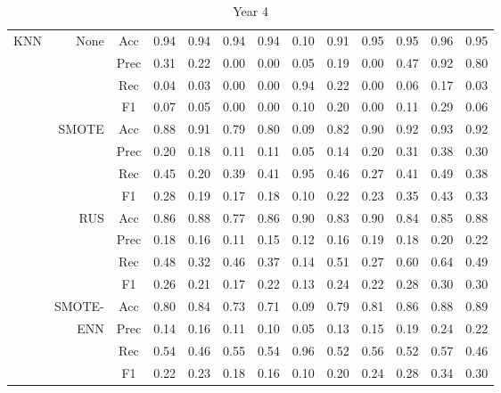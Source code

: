 \begin{table*}
\begin{narrow}{-1cm}{-1cm}
\begin{subtable}[t]{2.05\columnwidth}
\begin{tabular}{l|r|c|cccccccccc}
        KNN & None & Acc & 0.94 & 0.94 & 0.94 & 0.94 & 0.10 & 0.91 & 0.95 & 0.95 & 0.96 & 0.95 \\
        ~ & ~ & Prec & 0.31 & 0.22 & 0.00 & 0.00 & 0.05 & 0.19 & 0.00 & 0.47 & 0.92 & 0.80 \\
        ~ & ~ & Rec & 0.04 & 0.03 & 0.00 & 0.00 & 0.94 & 0.22 & 0.00 & 0.06 & 0.17 & 0.03 \\
        ~ & ~ & F1 & 0.07 & 0.05 & 0.00 & 0.00 & 0.10 & 0.20 & 0.00 & 0.11 & 0.29 & 0.06 \\
        \cline{2-13}
        ~ & SMOTE & Acc & 0.88 & 0.91 & 0.79 & 0.80 & 0.09 & 0.82 & 0.90 & 0.92 & 0.93 & 0.92 \\
        ~ & ~ & Prec & 0.20 & 0.18 & 0.11 & 0.11 & 0.05 & 0.14 & 0.20 & 0.31 & 0.38 & 0.30 \\
        ~ & ~ & Rec & 0.45 & 0.20 & 0.39 & 0.41 & 0.95 & 0.46 & 0.27 & 0.41 & 0.49 & 0.38 \\
        ~ & ~ & F1 & 0.28 & 0.19 & 0.17 & 0.18 & 0.10 & 0.22 & 0.23 & 0.35 & 0.43 & 0.33 \\
        \cline{2-13}
        ~ & RUS & Acc & 0.86 & 0.88 & 0.77 & 0.86 & 0.90 & 0.83 & 0.90 & 0.84 & 0.85 & 0.88 \\
        ~ & ~ & Prec & 0.18 & 0.16 & 0.11 & 0.15 & 0.12 & 0.16 & 0.19 & 0.18 & 0.20 & 0.22 \\
        ~ & ~ & Rec & 0.48 & 0.32 & 0.46 & 0.37 & 0.14 & 0.51 & 0.27 & 0.60 & 0.64 & 0.49 \\
        ~ & ~ & F1 & 0.26 & 0.21 & 0.17 & 0.22 & 0.13 & 0.24 & 0.22 & 0.28 & 0.30 & 0.30 \\
        \cline{2-13}
        ~ & SMOTE- & Acc & 0.80 & 0.84 & 0.73 & 0.71 & 0.09 & 0.79 & 0.81 & 0.86 & 0.88 & 0.89 \\
        ~ & ENN & Prec & 0.14 & 0.16 & 0.11 & 0.10 & 0.05 & 0.13 & 0.15 & 0.19 & 0.24 & 0.22 \\
        ~ & ~ & Rec & 0.54 & 0.46 & 0.55 & 0.54 & 0.96 & 0.52 & 0.56 & 0.52 & 0.57 & 0.46 \\
        ~ & ~ & F1 & 0.22 & 0.23 & 0.18 & 0.16 & 0.10 & 0.20 & 0.24 & 0.28 & 0.34 & 0.30 \\

       \hline \hline
         
         
    \end{tabular}
    \caption{\label{tab::results_y4} Year 4}
    
   
\end{subtable}

\end{narrow}
\end{table*} 






